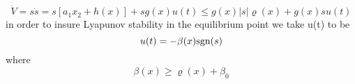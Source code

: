 \begin{equation}
  \dot{V} = s \dot{s} =  s[a_1 x_2 + h(x)] + s g(x) u(t) \leq g(x) \vert s\vert \varrho(x) + g(x) s u(t)
\end{equation}
in order to insure Lyapunov stability in the equilibrium point we take u(t) to be
\begin{equation}
  u(t) = -\beta(x) \mathrm{sgn}(s)
\end{equation}
where
\begin{equation}
  \beta (x) \geq \varrho (x) + \beta_0
\end{equation}
